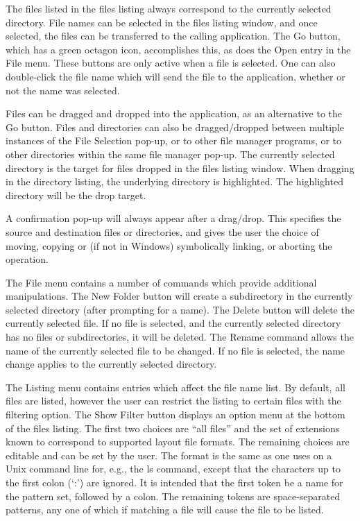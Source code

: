The files listed in the files listing always correspond to the
currently selected directory.  File names can be selected in the files
listing window, and once selected, the files can be transferred to the
calling application.  The {\cb Go} button, which has a green octagon
icon, accomplishes this, as does the {\cb Open} entry in the {\cb
File} menu.  These buttons are only active when a file is selected. 
One can also double-click the file name which will send the file to
the application, whether or not the name was selected.

Files can be dragged and dropped into the application, as an
alternative to the {\cb Go} button.  Files and directories can also be
dragged/dropped between multiple instances of the File Selection
pop-up, or to other file manager programs, or to other directories
within the same file manager pop-up.  The currently selected directory
is the target for files dropped in the files listing window.  When
dragging in the directory listing, the underlying directory is
highlighted.  The highlighted directory will be the drop target.

A confirmation pop-up will always appear after a drag/drop.  This
specifies the source and destination files or directories, and gives
the user the choice of moving, copying or (if not in Windows)
symbolically linking, or aborting the operation.

The {\cb File} menu contains a number of commands which provide
additional manipulations.  The {\cb New Folder} button will create a
subdirectory in the currently selected directory (after prompting for
a name).  The {\cb Delete} button will delete the currently selected
file.  If no file is selected, and the currently selected directory
has no files or subdirectories, it will be deleted.  The {\cb Rename}
command allows the name of the currently selected file to be changed. 
If no file is selected, the name change applies to the currently
selected directory.

The {\cb Listing} menu contains entries which affect the file name
list.  By default, all files are listed, however the user can restrict
the listing to certain files with the filtering option.  The {\cb Show
Filter} button displays an option menu at the bottom of the files
listing.  The first two choices are ``all files'' and the set of
extensions known to correspond to supported layout file formats.  The
remaining choices are editable and can be set by the user.  The format
is the same as one uses on a Unix command line for, e.g., the {\vt ls}
command, except that the characters up to the first colon (`:') are
ignored.  It is intended that the first token be a name for the
pattern set, followed by a colon.  The remaining tokens are
space-separated patterns, any one of which if matching a file will
cause the file to be listed.

